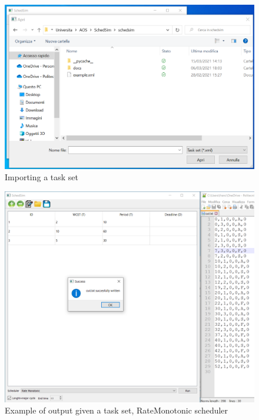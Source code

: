 \begin{figure}
\centering
\includegraphics[width=1\textwidth]{import.png}
\caption{\label{fig:frog}Importing a task set}
\end{figure}

\begin{figure}
\centering
\includegraphics[width=1\textwidth]{success.png}
\caption{\label{fig:frog}Example of output given a task set, RateMonotonic scheduler}
\end{figure}

